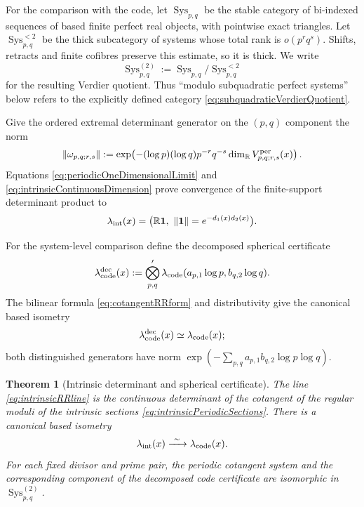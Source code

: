 \documentclass[11pt]{amsart}
\newtheorem{theorem}{Theorem}[section]
\theoremstyle{definition}
\theoremstyle{remark}
\newcommand{\R}{\mathbb R}
\begin{document}
For the comparison with the code, let $\operatorname{Sys}_{p,q}$ be the
stable category of bi-indexed sequences of based finite perfect real
objects, with pointwise exact triangles.  Let
$\operatorname{Sys}_{p,q}^{<2}$ be the thick subcategory of systems whose
total rank is $o(p^rq^s)$.  Shifts, retracts and finite cofibres preserve
this estimate, so it is thick.  We write
\begin{equation}\label{eq:subquadraticVerdierQuotient}
 \operatorname{Sys}_{p,q}^{(2)}
 :=\operatorname{Sys}_{p,q}/\operatorname{Sys}_{p,q}^{<2}
\end{equation}
for the resulting Verdier quotient.  Thus ``modulo subquadratic perfect
systems'' below refers to the explicitly defined category
\eqref{eq:subquadraticVerdierQuotient}.

Give the ordered extremal determinant generator on the $(p,q)$ component
the norm
\begin{equation}\label{eq:intrinsicFiniteMetric}
 \|\omega_{p,q;r,s}\|
 :=\exp\!\left(-(\log p)(\log q)p^{-r}q^{-s}
    \dim_\R V_{p,q;r,s}^{\rm per}(x)\right).
\end{equation}
Equations \eqref{eq:periodicOneDimensionalLimit} and
\eqref{eq:intrinsicContinuousDimension} prove convergence of the
finite-support determinant product to
\begin{equation}\label{eq:intrinsicRRline}
 \lambda_{\rm int}(x)
 =\bigl(\R\mathbf1,\ \|\mathbf1\|=e^{-d_1(x)d_2(x)}\bigr).
\end{equation}

For the system-level comparison define the decomposed spherical certificate
\begin{equation}\label{eq:decomposedCodeCertificate}
 \lambda_{\rm code}^{\rm dec}(x):=
 \bigotimes_{p,q}'
 \lambda_{\rm code}(a_{p,1}\log p,b_{q,2}\log q).
\end{equation}
The bilinear formula \eqref{eq:cotangentRRform} and distributivity give the
canonical based isometry
\begin{equation}\label{eq:decomposedTotalCodeIsometry}
 \lambda_{\rm code}^{\rm dec}(x)\simeq\lambda_{\rm code}(x);
\end{equation}
both distinguished generators have norm
$\exp(-\sum_{p,q}a_{p,1}b_{q,2}\log p\log q)$.

\begin{theorem}[Intrinsic determinant and spherical certificate]
\label{thm:intrinsicCodeComparison}
The line \eqref{eq:intrinsicRRline} is the continuous determinant of the
cotangent of the regular moduli of the intrinsic sections
\eqref{eq:intrinsicPeriodicSections}.  There is a canonical based isometry
\begin{equation}\label{eq:intrinsicCodeIsometry}
 \lambda_{\rm int}(x)\xrightarrow{\ \sim\ }\lambda_{\rm code}(x).
\end{equation}
For each fixed divisor and prime pair, the periodic cotangent system and the
corresponding component of the decomposed code certificate are isomorphic
in $\operatorname{Sys}_{p,q}^{(2)}$.
\end{theorem}
\end{document}
